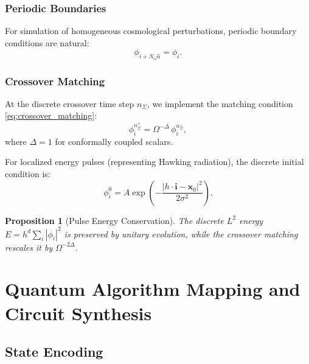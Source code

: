 \documentclass[11pt,a4paper]{article}
\newcommand{\conf}{\Omega}
\newcommand{\vecx}{\bm{x}}
\theoremstyle{plain}
\newtheorem{proposition}[theorem]{Proposition}
\theoremstyle{definition}
\theoremstyle{remark}
\begin{document}
\subsubsection{Periodic Boundaries}

For simulation of homogeneous cosmological perturbations, periodic boundary conditions are natural:
\begin{equation}
    \phi_{i + N_\alpha \hat{\alpha}} = \phi_i.
\end{equation}

\subsubsection{Crossover Matching}

At the discrete crossover time step $n_\Sigma$, we implement the matching condition \eqref{eq:crossover_matching}:
\begin{equation}\label{eq:discrete_crossover}
    \phi^{n_\Sigma^+}_i = \conf^{-\Delta}\, \phi^{n_\Sigma^-}_i,
\end{equation}
where $\Delta = 1$ for conformally coupled scalars.

For localized energy pulses (representing Hawking radiation), the discrete initial condition is:
\begin{equation}\label{eq:discrete_pulse}
    \phi^0_i = A \exp\left(-\frac{|h\cdot\bm{i} - \vecx_0|^2}{2\sigma^2}\right).
\end{equation}

\begin{proposition}[Pulse Energy Conservation]
The discrete $L^2$ energy $E = h^d \sum_i |\phi_i|^2$ is preserved by unitary evolution, while the crossover matching rescales it by $\conf^{-2\Delta}$.
\end{proposition}

\section{Quantum Algorithm Mapping and Circuit Synthesis}\label{sec:quantum_algorithms}

\subsection{State Encoding}\label{subsec:state_encoding}
\end{document}
